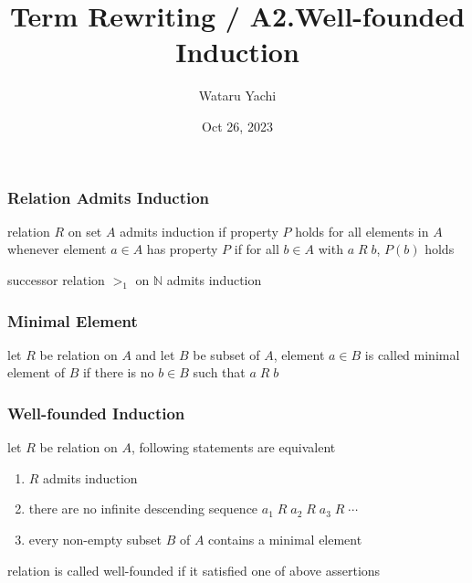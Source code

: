 \documentclass[12pt,aspectratio=169]{beamer}
\title{ Term Rewriting / A2.Well-founded Induction }
\author{Wataru Yachi}
\institute{JAIST}
\date{Oct 26, 2023}
\begin{document}
\maketitle



\begin{frame}
    \frametitle{Relation Admits Induction}
    \begin{definition}
        relation $R$ on set $A$ \alert{admits induction} if
        property $P$ holds for all elements in $A$ whenever
        element $a \in A$ has property $P$ if for all $b \in A$
        with $a \; R \; b$, $P(b)$ holds
    \end{definition}

    \begin{example}
        successor relation $>_1$ on $\mathbb{N}$ admits induction
    \end{example}
\end{frame}

\begin{frame}
    \frametitle{Minimal Element}

    \begin{definition}
        let $R$ be relation on $A$ and let $B$ be subset of $A$,
        element $a \in B$ is called \alert{minimal} element of $B$
        if there is no $b \in B$ such that $a \; R \; b$
    \end{definition}

    \begin{example}
    \end{example}
\end{frame}

\begin{frame}
    \frametitle{Well-founded Induction}

    \begin{theorem}
        let $R$ be relation on $A$, following statements are equivalent
        \begin{enumerate}
            \item $R$ admits induction
            \item there are no infinite descending sequence $a_1 \;R \; a_2 \; R \; a_3 \; R \; \cdots$
            \item every non-empty subset $B$ of $A$ contains a minimal element
        \end{enumerate}
    \end{theorem}

    \begin{definition}
        relation is called \alert{well-founded} if it
        satisfied one of above assertions
    \end{definition}
\end{frame}
\end{document}
